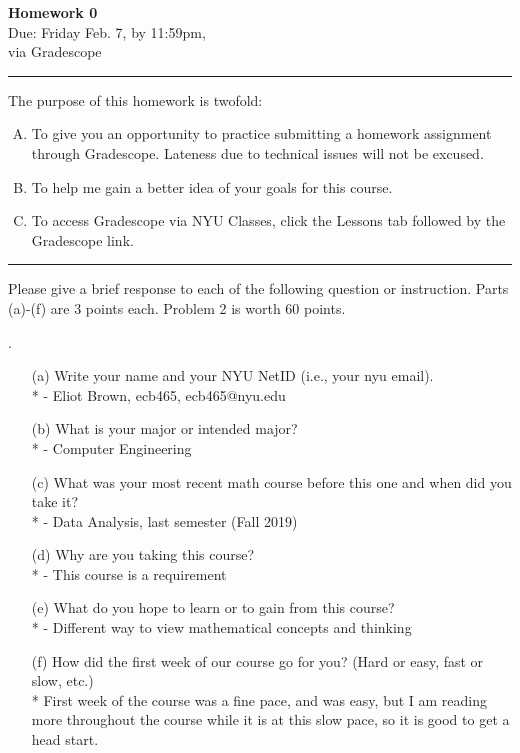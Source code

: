 \documentclass[12pt]{article}
\newif\ifshow
\begin{document}
\begin{center}
\ifshow
  \textbf{\Large Homework 0 Solution}\\
\else
  \textbf{\Large Homework 0}\\
\fi
Due: Friday Feb. 7, by 11:59pm,\\via Gradescope\\
\end{center}

\hrule

\vspace{0.2cm}




\noindent
The purpose of this homework is twofold:
\begin{enumerate}[A.]
\item To give you an opportunity to practice submitting a homework assignment through Gradescope.  Lateness due to technical issues will not be excused.  
\item To help me gain a better idea of your goals for this course.
\item To access Gradescope via NYU Classes, click the Lessons tab followed by the Gradescope link. 
\end{enumerate}

\hrule

\vspace{0.5cm}

\noindent
Please give a brief response to each of the following question or instruction.  Parts (a)-(f) are 3 points each. Problem 2 is worth 60 points.  
\vspace{.15in}


.   
\begin{enumerate}
\item[(a)] Write your name and your NYU NetID (i.e., your nyu email).
 \\*  - Eliot Brown, ecb465, ecb465@nyu.edu
\item[(b)] What is your major or intended major?
 \\* - Computer Engineering 
\item[(c)] What was your most recent math course before this one and when did you take it?
 \\* - Data Analysis, last semester (Fall 2019) 
\item[(d)] Why are you taking this course?
 \\* - This course is a requirement 
\item[(e)] What do you hope to learn or to gain from this course?
 \\* - Different way to view mathematical concepts and thinking
\item[(f)] How did the first week of our course go for you?  (Hard or easy, fast or slow, etc.)
 \\* First week of the course was a fine pace, and was easy, but I am reading more throughout the course while it is at this slow pace, so it is good to get a head start. 
\end{enumerate}
\end{document}
